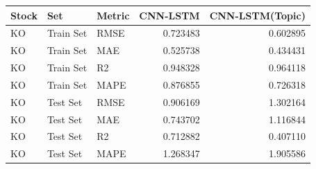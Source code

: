 \begin{tabular}{lllrr}
\toprule
Stock & Set & Metric & CNN-LSTM & CNN-LSTM(Topic) \\
\midrule
KO & Train Set & RMSE & 0.723483 & 0.602895 \\
KO & Train Set & MAE & 0.525738 & 0.434431 \\
KO & Train Set & R2 & 0.948328 & 0.964118 \\
KO & Train Set & MAPE & 0.876855 & 0.726318 \\
KO & Test Set & RMSE & 0.906169 & 1.302164 \\
KO & Test Set & MAE & 0.743702 & 1.116844 \\
KO & Test Set & R2 & 0.712882 & 0.407110 \\
KO & Test Set & MAPE & 1.268347 & 1.905586 \\
\bottomrule
\end{tabular}
